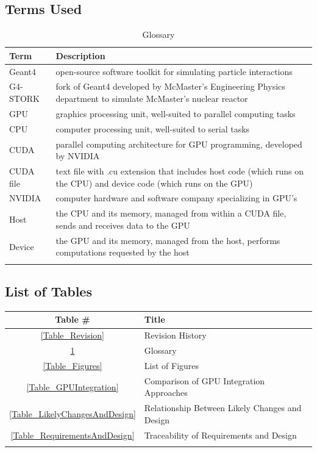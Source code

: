 \documentclass[12pt]{article}
\begin{document}
\subsection{Terms Used}
\begin{table}[h]
\centering
\caption{Glossary}\label{Table_Glossary}
\begin{tabularx}{\textwidth}{lX}
\toprule
\bf Term & \bf Description\\\midrule
\arrayrulecolor{lightgray}
Geant4 & open-source software toolkit for simulating particle interactions\\\hline
G4-STORK & fork of Geant4 developed by McMaster's Engineering Physics department to simulate McMaster's nuclear reactor\\\hline
GPU & graphics processing unit, well-suited to parallel computing tasks\\\hline
CPU & computer processing unit, well-suited to serial tasks\\\hline
CUDA & parallel computing architecture for GPU programming, developed by NVIDIA\\\hline
CUDA file & text file with .cu extension that includes host code (which runs on the CPU) and device code (which runs on the GPU)\\\hline
NVIDIA & computer hardware and software company specializing in GPU's\\\hline
Host & the CPU and its memory, managed from within a CUDA file, sends and receives data to the GPU\\\hline
Device & the GPU and its memory, managed from the host, performs computations requested by the host\\
\arrayrulecolor{black}
\bottomrule
\end{tabularx}
\end{table}

\subsection{List of Tables}
\begin{center}
\begin{tabular}{cl}
\toprule
\bf Table \# & \bf Title\\\midrule
\arrayrulecolor{lightgray}
\ref{Table_Revision} & Revision History\\\hline
\ref{Table_Glossary} & Glossary\\\hline
\ref{Table_Figures}  & List of Figures\\\hline
\ref{Table_GPUIntegration} & Comparison of GPU Integration Approaches\\\hline
\ref{Table_LikelyChangesAndDesign} & Relationship Between Likely Changes and Design\\\hline
\ref{Table_RequirementsAndDesign} & Traceability of Requirements and Design\\
\arrayrulecolor{black}
\bottomrule
\end{tabular}
\end{center}
\end{document}

